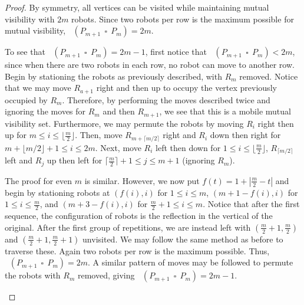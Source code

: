 \documentclass[a4paper,12pt]{article}
\DeclareMathOperator{\mobmv}{Mob_{\mu}}
\DeclareMathOperator{\cmobmv}{Mob^*_{\mu}}
\DeclareMathOperator{\cp}{\,\square\,}
\theoremstyle{definition}
\begin{document}
\begin{proof}
		By symmetry, all vertices can be visited while maintaining mutual visibility with $2m$ robots. Since two robots per row is the maximum possible for mutual visibility, $\mobmv(P_{m+1} \cp P_m) = 2m$.
		
		To see that $\cmobmv(P_{m+1} \cp P_m) = 2m - 1$, first notice that $\cmobmv(P_{m+1} \cp P_m) < 2m$, since when there are two robots in each row, no robot can move to another row. Begin by stationing the robots as previously described, with $R_m$ removed. Notice that we may move $R_{a+1}$ right and then up to occupy the vertex previously occupied by $R_{m}$. Therefore, by performing the moves described twice and ignoring the moves for $R_m$ and then $R_{m+1}$, we see that this is a mobile mutual visibility set. Furthermore, we may permute the robots by moving $R_i$ right then up for $m \leq i \leq \lfloor \frac{m}{2} \rfloor$. Then, move $R_{m + \lceil m/2 \rceil}$ right and $R_i$ down then right for $m + \lfloor m/2 \rfloor + 1 \leq i \leq 2m$. Next, move $R_i$ left then down for $1 \leq i \leq \lfloor \frac{m}{2} \rfloor$, $R_{ \lceil m/2 \rceil}$ left and $R_j$ up then left for $\lceil \frac{m}{2} \rceil + 1 \leq j \leq m+1$ (ignoring $R_m$).
		
		The proof for even $m$ is similar. However, we now put $f(t)= 1+|\frac{m}{2} - t|$ and begin by stationing robots at $(f(i),i)$ for $1 \leq i \leq m$, $(m+1-f(i), i)$ for $1 \leq i \leq \frac{m}{2}$, and $(m+3-f(i), i)$ for $\frac{m}{2} + 1 \leq i \leq m$. Notice that after the first sequence, the configuration of robots is the reflection in the vertical of the original. After the first group of repetitions, we are instead left with $(\frac{m}{2}+1, \frac{m}{2})$ and $(\frac{m}{2}+1, \frac{m}{2} + 1)$ unvisited. We may follow the same method as before to traverse these. Again two robots per row is the maximum possible. Thus, $\mobmv(P_{m+1} \cp P_m) = 2m$. A similar pattern of moves may be followed to permute the robots with $R_m$ removed, giving $\cmobmv(P_{m+1} \cp P_m) = 2m - 1$.
		
		\begin{figure}[h]
			
			\centering
			
			\captionsetup{justification=centering}
			
			\begin{tikzpicture}[x=0.2mm,y=-0.2mm,inner sep=0.2mm,scale=1,thick,vertex/.style={circle,draw,minimum size=10},
				occupied/.style={fill=black},
				occupied20/.style = {occupied},
				occupied11/.style = {occupied},
				occupied31/.style = {occupied},
				occupied02/.style = {occupied},
				occupied42/.style = {occupied},
				occupied03/.style = {occupied},
				occupied53/.style = {occupied},
				occupied54/.style = {occupied},
				occupied14/.style = {occupied},
				occupied25/.style = {occupied},
				occupied45/.style = {occupied},
				occupied36/.style = {occupied},]
				

\end{tikzpicture}
\end{figure}
\end{proof}
\end{document}

